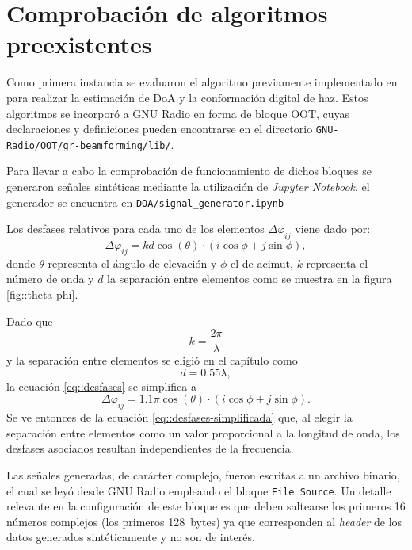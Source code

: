 \documentclass[../../main.tex]{subfiles}
\begin{document}

\section{Comprobación de algoritmos preexistentes}
Como primera instancia se evaluaron el algoritmo previamente implementado en \cite{proyecto-grigo} para realizar la estimación de DoA y la conformación digital de haz. Estos algoritmos se incorporó a GNU Radio en forma de bloque OOT, cuyas declaraciones y definiciones pueden encontrarse en el directorio \texttt{GNU-Radio/OOT/gr-beamforming/lib/}.

Para llevar a cabo la comprobación de funcionamiento de dichos bloques se generaron señales sintéticas mediante la utilización de \textit{Jupyter Notebook}, el generador se encuentra en \texttt{DOA/signal\_generator.ipynb}

Los desfases relativos para cada uno de los elementos $\Delta \varphi_{ij}$ viene dado por:
\begin{equation}
    \Delta \varphi_{ij} = k d \cos (\theta) \cdot (i \cos \phi + j \sin \phi),
    \label{eq::desfases}
\end{equation}
donde $\theta$ representa el ángulo de elevación y $\phi$ el de acimut, $k$ representa el número de onda y $d$ la separación entre elementos como se muestra en la figura \ref{fig::theta-phi}.

Dado que \[k =  \frac{2 \pi}{\lambda}\] y la separación entre elementos se eligió en el capítulo  como \[d = 0.55\lambda,\] la ecuación \ref{eq::desfases} se simplifica a 
\begin{equation}
    \Delta \varphi_{ij} = 1.1 \pi \cos (\theta) \cdot (i \cos \phi + j \sin \phi).
    \label{eq::desfases-simplificada}
\end{equation}
Se ve entonces de la ecuación \ref{eq::desfases-simplificada} que, al elegir la separación entre elementos como un valor proporcional a la longitud de onda, los desfases asociados resultan independientes de la frecuencia.

Las señales generadas, de carácter complejo, fueron escritas a un archivo binario, el cual se leyó desde GNU Radio empleando el bloque \texttt{File Source}. Un detalle relevante en la configuración de este bloque es que deben saltearse los primeros 16 números complejos (los primeros 128~bytes) ya que corresponden al \textit{header} de los datos generados sintéticamente y no son de interés. 
\end{document}
